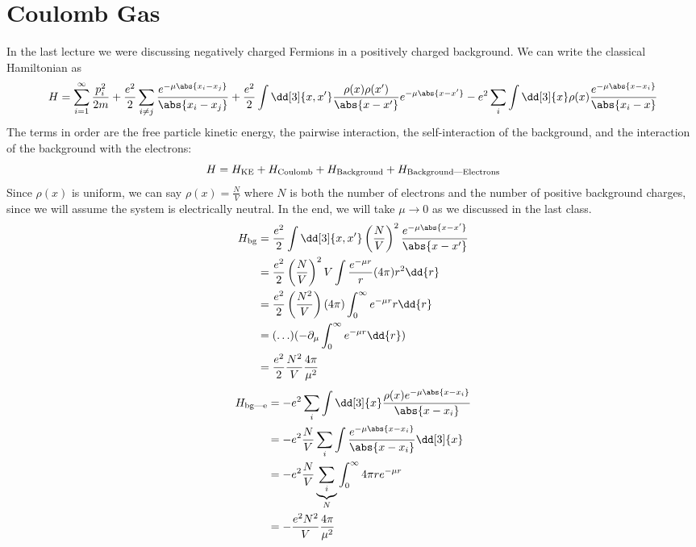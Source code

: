 \documentclass[a4paper,twoside,master.tex]{subfiles}
\begin{document}

\section{Coulomb Gas}
\label{sec:coulomb_gas}

In the last lecture we were discussing negatively charged Fermions in a positively charged background. We can write the classical Hamiltonian as
\begin{equation}
    H = \sum_{i=1}^{\infty} \frac{p_i^2}{2m} + \frac{e^2}{2} \sum_{i \neq j} \frac{e^{- \mu \abs{x_i - x_j}}}{\abs{x_i - x_j}} + \frac{e^2}{2} \int \dd[3]{x,x'} \frac{\rho(x) \rho(x')}{\abs{x - x'}} e^{- \mu \abs{x - x'}} - e^2 \sum_i \int \dd[3]{x} \rho(x) \frac{e^{- \mu\abs{x - x_i}}}{\abs{x_i - x}}
\end{equation}
The terms in order are the free particle kinetic energy, the pairwise interaction, the self-interaction of the background, and the interaction of the background with the electrons:
\begin{equation}
    H = H_{\text{KE}} + H_{\text{Coulomb}} + H_{\text{Background}} + H_{\text{Background\textemdash Electrons}}
\end{equation}
Since $ \rho(x) $ is uniform, we can say $ \rho(x) = \frac{N}{V} $ where $ N $ is both the number of electrons and the number of positive background charges, since we will assume the system is electrically neutral. In the end, we will take $ \mu \to 0 $ as we discussed in the last class.
\begin{align}
    H_{\text{bg}} &= \frac{e^2}{2} \int \dd[3]{x,x'} \left( \frac{N}{V} \right)^2 \frac{e^{- \mu \abs{x-x'}}}{\abs{x - x'}} \\
    &= \frac{e^2}{2} \left( \frac{N}{V} \right)^2 V \int \frac{e^{- \mu r}}{r} (4 \pi)r^2 \dd{r} \\
    &= \frac{e^2}{2} \left( \frac{N^2}{V} \right) (4 \pi) \int_0^{\infty} e^{- \mu r} r \dd{r} \\
    &= (\ldots) (- \partial_{\mu} \int_0^{\infty} e^{- \mu r} \dd{r}) \\
    &= \frac{e^2}{2} \frac{N^2}{V} \frac{4 \pi}{\mu^2}
\end{align}
\begin{align}
    H_{\text{bg\textemdash e}} &= - e^2 \sum_i \int \dd[3]{x} \frac{\rho(x) e^{- \mu \abs{x - x_i}}}{\abs{x - x_i}} \\
    &= - e^2 \frac{N}{V} \sum_i \int \frac{e^{- \mu \abs{x - x_i}}}{\abs{x - x_i}} \dd[3]{x} \\
    &= - e^2 \frac{N}{V} \underbrace{\sum_i}_{N} \int_0^{\infty} 4 \pi r e^{- \mu r} \\
    &= - \frac{e^2 N^2}{V} \frac{4 \pi}{\mu^2}
\end{align}
\end{document}
